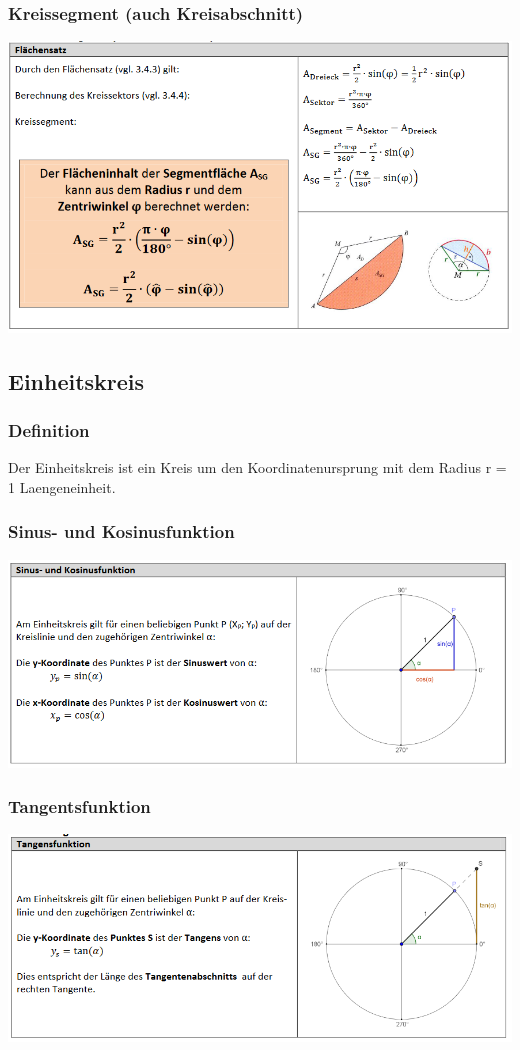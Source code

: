 \subsubsection{Kreissegment (auch Kreisabschnitt)}
\includegraphics[scale=0.7]{kreissegment.PNG}



\subsection{Einheitskreis}
\subsubsection{Definition}
Der Einheitskreis ist ein Kreis um den Koordinatenursprung mit dem Radius r = 1 Laengeneinheit.
\subsubsection{Sinus- und Kosinusfunktion}
\includegraphics[scale=0.7]{einheitskreis1.PNG}
\subsubsection{Tangentsfunktion}
\includegraphics[scale=0.7]{einheitskreis2.PNG}
